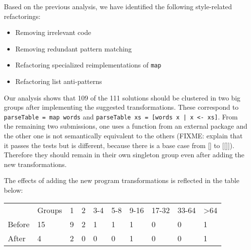 Based on the previous analysis, we have identified the following style-related refactorings:

\begin{itemize}
    \item Removing irrelevant code
    \item Removing redundant pattern matching
    \item Refactoring specialized reimplementations of \texttt{map}
    \item Refactoring list anti-patterns
\end{itemize}

Our analysis shows that 109 of the 111 solutions should be clustered in two big groups after implementing the suggested transformations. These correspond to \texttt{parseTable = map words} and \texttt{parseTable xs = [words x | x <- xs]}. From the remaining two submissions, one uses a function from an external package and the other one is not semantically equivalent to the others (FIXME: explain that it passes the tests but is different, because there is a base case from [] to [[]]). Therefore they should remain in their own singleton group even after adding the new transformations.

The effects of adding the new program transformations is reflected in the table below:

\begin{tabular}{l l l l l l l l l l}
             & Groups & 1     & 2   & 3-4 & 5-8 & 9-16 & 17-32 & 33-64 & >64 \\
    Before   & 15     & 9     & 2   & 1   & 1   &  1   & 0     & 0     & 1   \\
    After    & 4      & 2     & 0   & 0   & 0   &  1   & 0     & 0     & 1
\end{tabular}
